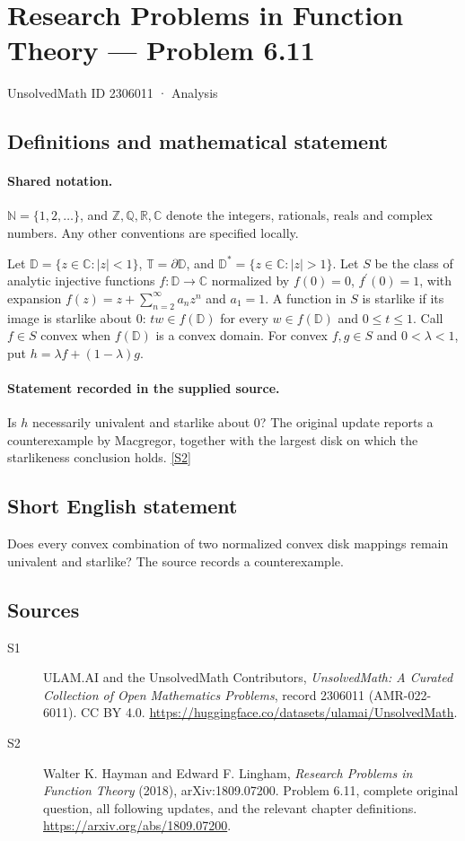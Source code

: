 \documentclass[11pt]{book}
\newcommand{\sref}[2]{\hyperlink{source:#1:#2}{[S#2]}}
\begin{document}
\setcounter{section}{2306010}
\section{Research Problems in Function Theory — Problem 6.11}\label{2306011}
{\small\sffamily UnsolvedMath ID 2306011 · Analysis}
\subsection{Definitions and mathematical statement}

\paragraph{Shared notation.}$\mathbb N=\{1,2,\ldots\}$, and $\mathbb Z,\mathbb Q,\mathbb R,\mathbb C$ denote the integers, rationals, reals and complex numbers. Any other conventions are specified locally.


Let $\mathbb D=\{z\in\mathbb C:|z|<1\}$, $\mathbb T=\partial\mathbb D$, and $\mathbb D^*=\{z\in\mathbb C:|z|>1\}$. Let $S$ be the class of analytic injective functions $f:\mathbb D\to\mathbb C$ normalized by $f(0)=0$, $f^{\prime}(0)=1$, with expansion $f(z)=z+\sum_{n=2}^{\infty}a_nz^n$ and $a_1=1$. A function in $S$ is starlike if its image is starlike about $0$: $tw\in f(\mathbb D)$ for every $w\in f(\mathbb D)$ and $0\le t\le1$. Call $f\in S$ convex when $f(\mathbb D)$ is a convex domain. For convex $f,g\in S$ and $0<\lambda<1$, put $h=\lambda f+(1-\lambda)g$.
\paragraph{Statement recorded in the supplied source.}
Is $h$ necessarily univalent and starlike about $0$? The original update reports a counterexample by Macgregor, together with the largest disk on which the starlikeness conclusion holds. \sref{2306011}{2}
\subsection{Short English statement}
Does every convex combination of two normalized convex disk mappings remain univalent and starlike? The source records a counterexample.
\subsection{Sources}
\begin{description}
\item[\hypertarget{source:2306011:1}{S1}] ULAM.AI and the UnsolvedMath Contributors, \emph{UnsolvedMath: A Curated Collection of Open Mathematics Problems}, record 2306011 (AMR-022-6011). CC BY 4.0. \url{https://huggingface.co/datasets/ulamai/UnsolvedMath}.
\item[\hypertarget{source:2306011:2}{S2}] Walter K. Hayman and Edward F. Lingham, \emph{Research Problems in Function Theory} (2018), arXiv:1809.07200. Problem 6.11, complete original question, all following updates, and the relevant chapter definitions. \url{https://arxiv.org/abs/1809.07200}.
\end{description}
\label{end:2306011}
\end{document}
